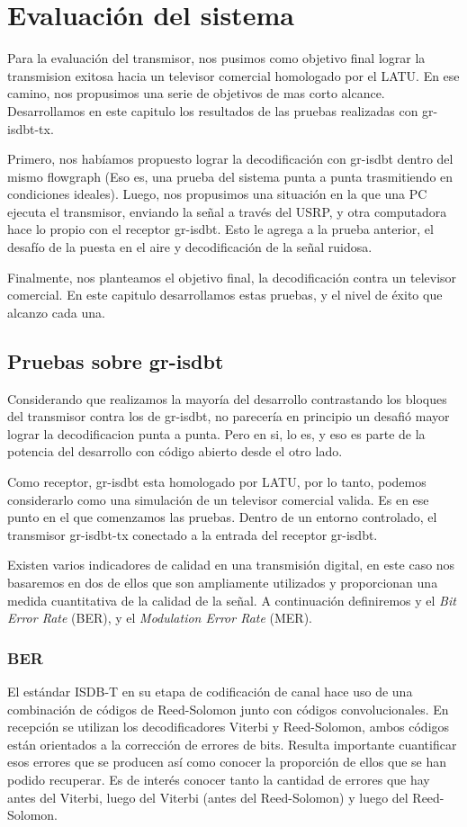 \chapter{Evaluación del sistema}

Para la evaluación del transmisor, nos pusimos como objetivo final lograr la transmision exitosa hacia un televisor comercial homologado por el LATU. En ese camino, nos propusimos una serie de objetivos de mas corto alcance. Desarrollamos en este capitulo los resultados de las pruebas realizadas con gr-isdbt-tx.

Primero, nos habíamos propuesto lograr la decodificación con gr-isdbt dentro del mismo flowgraph (Eso es, una prueba del sistema punta a punta trasmitiendo en condiciones ideales). Luego, nos propusimos una situación en la que una PC ejecuta el transmisor, enviando la señal a través del USRP, y otra computadora hace lo propio con el receptor gr-isdbt. Esto le agrega a la prueba anterior, el desafío de la puesta en el aire y decodificación de la señal ruidosa.

Finalmente, nos planteamos el objetivo final, la decodificación contra un televisor comercial. En este capitulo desarrollamos estas pruebas, y el nivel de éxito que alcanzo cada una.

\section{Pruebas sobre gr-isdbt}

Considerando que realizamos la mayoría del desarrollo contrastando los bloques del transmisor contra los de gr-isdbt, no parecería en principio un desafió mayor lograr la decodificacion punta a punta. Pero en si, lo es, y eso es parte de la potencia del desarrollo con código abierto desde el otro lado. 

Como receptor, gr-isdbt esta homologado por LATU, por lo tanto, podemos considerarlo como una simulación de un televisor comercial valida. Es en ese punto en el que comenzamos las pruebas. Dentro de un entorno controlado, el transmisor gr-isdbt-tx conectado a la entrada del receptor gr-isdbt.

Existen varios indicadores de calidad en una transmisión digital, en este caso nos basaremos en dos de ellos que son ampliamente utilizados y proporcionan una medida cuantitativa de la calidad de la señal. A continuación definiremos y el \textit{Bit Error Rate} (BER), y el \textit{Modulation Error Rate} (MER).

\subsection{BER}
El estándar ISDB-T en su etapa de codificación de canal hace uso de una combinación de códigos de Reed-Solomon junto con códigos convolucionales. En recepción se utilizan los decodificadores Viterbi y Reed-Solomon, ambos códigos están orientados a la corrección de errores de bits. Resulta importante cuantificar esos errores que se producen así como conocer la proporción de ellos que se han podido recuperar. Es de interés conocer tanto la cantidad de errores que hay antes del Viterbi, luego del Viterbi (antes del Reed-Solomon) y luego del Reed-Solomon.

